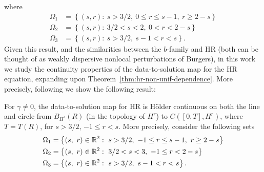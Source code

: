 %
%
where
\begin{equation*}
\begin{split}
\Omega_{1} & = \left\{ (s, r): \   s > 3/2, \ 0 \le r \le s-1, \  r \ge 2-s \right\}
\\
\Omega_{2} & = \left\{(s, r): \  3/2 < s < 2, \ 0 < r < 2-s   \right\}
\\
\Omega_{3} & = \left\{ (s,r): \  s > 3/2, \ s-1 < r < s  \right\}.
\end{split}
\end{equation*}
Given this result, and the similarities between the $b$-family and HR (both can
be thought of as weakly dispersive nonlocal perturbations of Burgers), in this
work we study the continuity properties of the
data-to-solution map for the HR equation, expanding upon Theorem~\ref{thm:hr-non-unif-dependence}. More precisely, following \cite{Chen:2011fk} we show
the following result:
%
%
\begin{theorem}
For $\gamma \neq 0$, the
data-to-solution map for HR is H\"older continuous on both the line and circle from $B_{H^{s}}(R)$ (in
the topology of $H^{r}$) to $C([0, T], H^{r})$, where $T = T(R)$, for $s >
3/2$, $-1 \le r < s$. More
precisely, consider the following sets 
%
%
\begin{equation*}
\begin{split}
& \Omega_{1} = \left\{ (s, \ r) \in \mathbb{R}^{2}:
\ s>3/2, \ -1 \le r \le s-1, \  r \ge 2 -s  \right\}
\\
& \Omega_{2} = \left\{ (s, \ r) \in \mathbb{R}^{2}:
\ 3/2 < s < 3, \ -1 \le r < 2-s \right\}
\\
& \Omega_{3} = \left\{ (s, \ r) \in \mathbb{R}^{2}:
\  s>3/2, \  s-1 < r < s  \right\}.
\end{split}
\end{equation*}
%
%
\label{thm:main-thm}
\end{theorem}
%
\begin{center}
\end{center}
